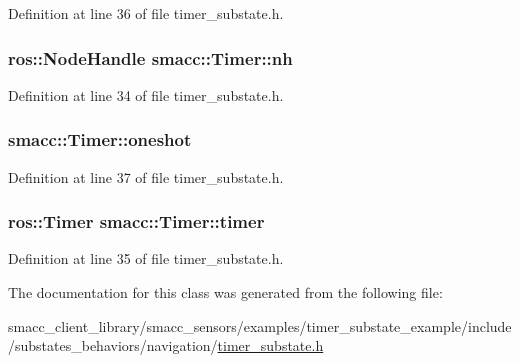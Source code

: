 Definition at line 36 of file timer\+\_\+substate.\+h.

\subsubsection[{\texorpdfstring{nh}{nh}}]{\setlength{\rightskip}{0pt plus 5cm}ros\+::\+Node\+Handle smacc\+::\+Timer\+::nh}\hypertarget{classsmacc_1_1Timer_a84b2854ae319292c9351325d98615a66}{}\label{classsmacc_1_1Timer_a84b2854ae319292c9351325d98615a66}


Definition at line 34 of file timer\+\_\+substate.\+h.

\subsubsection[{\texorpdfstring{oneshot}{oneshot}}]{ smacc\+::\+Timer\+::oneshot}\hypertarget{classsmacc_1_1Timer_a8b460b006b7173f718dfa5868c0eb59d}{}\label{classsmacc_1_1Timer_a8b460b006b7173f718dfa5868c0eb59d}


Definition at line 37 of file timer\+\_\+substate.\+h.

\subsubsection[{\texorpdfstring{timer}{timer}}]{\setlength{\rightskip}{0pt plus 5cm}ros\+::\+Timer smacc\+::\+Timer\+::timer}\hypertarget{classsmacc_1_1Timer_a1376795baefaab38614fc108aeb4f36c}{}\label{classsmacc_1_1Timer_a1376795baefaab38614fc108aeb4f36c}


Definition at line 35 of file timer\+\_\+substate.\+h.



The documentation for this class was generated from the following file\+:\begin{DoxyCompactItemize}
\item 
smacc\+\_\+client\+\_\+library/smacc\+\_\+sensors/examples/timer\+\_\+substate\+\_\+example/include/substates\+\_\+behaviors/navigation/\hyperlink{timer__substate_8h}{timer\+\_\+substate.\+h}\end{DoxyCompactItemize}
